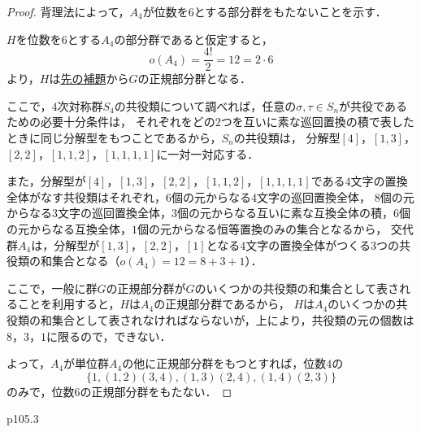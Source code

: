 \documentclass[dvipdfmx,uplatex,11pt]{jsarticle}
\theoremstyle{mytheorem}
\begin{document}
        \begin{leftbar}
            \begin{proof}
                背理法によって，$A_4$が位数を$6$とする部分群をもたないことを示す．

                $H$を位数を$6$とする$A_4$の部分群であると仮定すると，
                \[
                    o(A_4) = \frac{4!}{2}=12 = 2 \cdot 6
                \]
                より，$H$は\hyperref[lem:p105.1]{先の補題}から$G$の正規部分群となる．

                ここで，$4$次対称群$S_4$の共役類について調べれば，任意の$\sigma , \tau \in S_n$が共役であるための必要十分条件は，
                それぞれをどの$2$つを互いに素な巡回置換の積で表したときに同じ分解型をもつことであるから，$S_n$の共役類は，
                分解型$[4]$，$[1,3]$，$[2,2]$，$[1,1,2]$，$[1,1,1,1]$に一対一対応する．

                また，分解型が$[4]$，$[1,3]$，$[2,2]$，$[1,1,2]$，$[1,1,1,1]$である$4$文字の置換全体がなす共役類はそれぞれ，$6$個の元からなる$4$文字の巡回置換全体，
                $8$個の元からなる$3$文字の巡回置換全体，$3$個の元からなる互いに素な互換全体の積，$6$個の元からなる互換全体，$1$個の元からなる恒等置換のみの集合となるから，
                交代群$A_4$は，分解型が$[1,3]$，$[2,2]$，$[1]$となる$4$文字の置換全体がつくる$3$つの共役類の和集合となる（$o(A_4)=12=8+3+1$）．

                ここで，一般に群$G$の正規部分群が$G$のいくつかの共役類の和集合として表されることを利用すると，$H$は$A_4$の正規部分群であるから，
                $H$は$A_4$のいくつかの共役類の和集合として表されなければならないが，上により，共役類の元の個数は$8$，$3$，$1$に限るので，できない．

                よって，$A_4$が単位群$A_4$の他に正規部分群をもつとすれば，位数$4$の
                \[
                    \{1,(1,2)(3,4),(1,3)(2,4),(1,4)(2,3)\}
                \]
                のみで，位数$6$の正規部分群をもたない．
            \end{proof}
        \end{leftbar}

        p105.3
\end{document}
